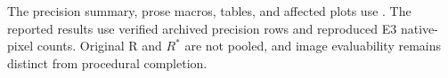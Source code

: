 The precision summary, prose macros, tables, and affected plots use . The reported results use verified archived precision rows and reproduced E3 native-pixel counts. Original R and \(R^{*}\) are not pooled, and image evaluability remains distinct from procedural completion.





